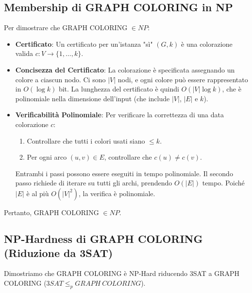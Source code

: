 \documentclass[a4paper, 11pt]{book} %
\theoremstyle{definition}
\begin{document}
\subsection{Membership di GRAPH COLORING in NP}
Per dimostrare che GRAPH COLORING $\in NP$:
\begin{itemize}
    \item \textbf{Certificato}: Un certificato per un'istanza "sì" $(G, k)$ è una colorazione valida $c: V \to \{1, \dots, k\}$.
    \item \textbf{Concisezza del Certificato}: La colorazione è specificata assegnando un colore a ciascun nodo. Ci sono $|V|$ nodi, e ogni colore può essere rappresentato in $O(\log k)$ bit. La lunghezza del certificato è quindi $O(|V| \log k)$, che è polinomiale nella dimensione dell'input (che include $|V|$, $|E|$ e $k$).
    \item \textbf{Verificabilità Polinomiale}: Per verificare la correttezza di una data colorazione $c$:
        \begin{enumerate}
            \item Controllare che tutti i colori usati siano $\le k$.
            \item Per ogni arco $(u, v) \in E$, controllare che $c(u) \ne c(v)$.
        \end{enumerate}
    Entrambi i passi possono essere eseguiti in tempo polinomiale. Il secondo passo richiede di iterare su tutti gli archi, prendendo $O(|E|)$ tempo. Poiché $|E|$ è al più $O(|V|^2)$, la verifica è polinomiale.
\end{itemize}
Pertanto, GRAPH COLORING $\in NP$.

\subsection{NP-Hardness di GRAPH COLORING (Riduzione da 3SAT)}
Dimostriamo che GRAPH COLORING è NP-Hard riducendo 3SAT a GRAPH COLORING ($3SAT \le_p GRAPH\ COLORING$).
\end{document}
